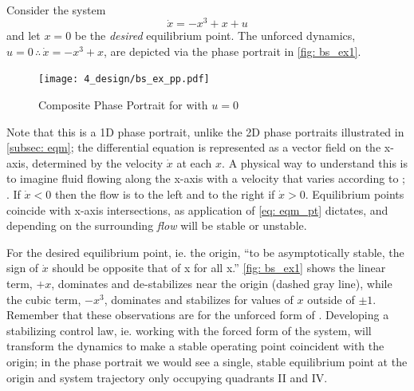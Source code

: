 \documentclass[12pt]{ucthesis}
\begin{document}
\begin{eg} \alignright \citet[Ex. 3.1]{Harkegard2003} \label{eg: bs_useful}\\
	\indent Consider the system
		\begin{equation} \label{eq: bs_ex_sys}
			\dot{x} = -x^3 + x + u
		\end{equation}
	and let $x=0$ be the \textit{desired} equilibrium point. The unforced dynamics, $u=0 \,\therefore\, \dot{x}=-x^3+x$, are depicted via the phase portrait in \autoref{fig: bs_ex1}. 

	\begin{figure}[tb]%
		\begin{adjustwidth}{-1in}{-1in}%
			\centering%
			\texttt{[image: 4\_design/bs\_ex\_pp.pdf]}%
		\end{adjustwidth}%
		\caption{Composite Phase Portrait for  with $u=0$}%
		\label{fig: bs_ex1}%
	\end{figure}
	
	Note that this is a 1D phase portrait, unlike the 2D phase portraits illustrated in \autoref{subsec: eqm}; the differential equation is represented as a vector field on the x-axis, determined by the velocity  $\dot{x}$ at each $x$. A physical way to understand this is to imagine fluid flowing along the x-axis with a velocity that varies according to ; \citet{Strogatz1994}. If $\dot{x}<0$ then the flow is to the left and to the right if $\dot{x}>0$. Equilibrium points coincide with x-axis intersections, as application of \autoref{eq: eqm_pt} dictates, and depending on the surrounding \textit{flow} will be stable or unstable. 
	
	For the desired equilibrium point, ie. the origin, ``to be asymptotically stable, the sign of $\dot{x}$ should be opposite that of x for all x.'' \autoref{fig: bs_ex1} shows the linear term, $+x$, dominates and de-stabilizes near the origin (dashed gray line), while the cubic term, $-x^3$, dominates and stabilizes for values of $x$ outside of $\pm1$. Remember that these observations are for the unforced form of . Developing a stabilizing control law, ie. working with the forced form of the system, will transform the dynamics to make a stable operating point coincident with the origin; in the phase portrait we would see a single, stable equilibrium point at the origin and system trajectory only occupying quadrants II and IV.
	

\end{eg}
\end{document}
